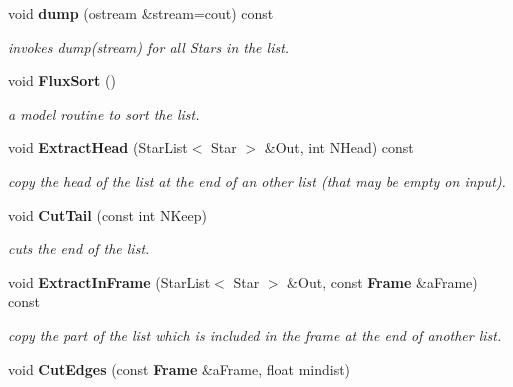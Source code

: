 \begin{CompactItemize}
\item 
{}
void {\bf dump} (ostream \&stream=cout) const\label{class_starlist_a7}

\begin{CompactList}\small\item\em invokes dump(stream) for all Stars in the list.\item\end{CompactList}\item 
void {\bf Flux\-Sort} ()
\begin{CompactList}\small\item\em a model routine to sort the list.\item\end{CompactList}\item 
{}
void {\bf Extract\-Head} (Star\-List$<$ Star $>$ \&Out, int NHead) const\label{class_starlist_a9}

\begin{CompactList}\small\item\em copy the head of the list at the end of an other list (that may be empty on input).\item\end{CompactList}\item 
{}
void {\bf Cut\-Tail} (const int NKeep)\label{class_starlist_a10}

\begin{CompactList}\small\item\em cuts the end of the list.\item\end{CompactList}\item 
{}
void {\bf Extract\-In\-Frame} (Star\-List$<$ Star $>$ \&Out, const {\bf Frame} \&a\-Frame) const\label{class_starlist_a11}

\begin{CompactList}\small\item\em copy the part of the list which is included in the frame at the end of another list.\item\end{CompactList}\item 
{}
void {\bf Cut\-Edges} (const {\bf Frame} \&a\-Frame, float mindist)\label{class_starlist_a12}


\end{CompactItemize}
